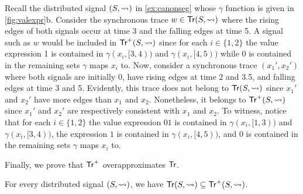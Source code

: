 \begin{example} \label{ex:overapx}
	Recall the distributed signal $(S, {\rightsquigarrow})$ in \cref{ex:canonseg} whose $\gamma$ function is given in \cref{fig:valexpr}b.
	Consider the synchronous trace $w \in \mathsf{Tr}(S, {\rightsquigarrow})$ where the rising edges of both signals occur at time 3 and the falling edges at time 5.
	A signal such as $w$ would be included in $\mathsf{Tr}^+(S,{\rightsquigarrow})$ since for each $i \in \{1,2\}$ the value expression 1 is contained in $\gamma(x_i, [3,4))$ and $\gamma(x_i, [4,5))$ while 0 is contained in the remaining sets $\gamma$ maps $x_i$ to.
	Now, consider a synchronous trace $(x_1', x_2')$ where both signals are initially 0, have rising edges at time 2 and 3.5, and falling edges at time 3 and 5.
	Evidently, this trace does not belong to $\mathsf{Tr}(S, {\rightsquigarrow})$ since $x_1'$ and $x_2'$ have more edges than $x_1$ and $x_2$.
	Nonetheless, it belongs to $\mathsf{Tr}^+(S,{\rightsquigarrow})$ since $x_1'$ and $x_2'$ are respectively consistent with $x_1$ and $x_2$.
	To witness, notice that for each $i \in \{1,2\}$ the value expression $01$ is contained in $\gamma(x_i, [1,3))$ and $\gamma(x_i, [3,4))$, the expression $1$ is contained in $\gamma(x_i, [4,5))$, and 0 is contained in the remaining sets $\gamma$ maps $x_i$ to.
\end{example}

Finally, we prove that $\mathsf{Tr}^+$ overapproximates $\mathsf{Tr}$.

\begin{lemma} \label{cl:trsound}
	For every distributed signal $(S,{\rightsquigarrow})$, we have $\mathsf{Tr}(S,{\rightsquigarrow}) \subseteq \mathsf{Tr}^+(S,{\rightsquigarrow})$.
\end{lemma}

